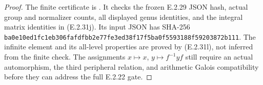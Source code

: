 \begin{proof}
The finite certificate is
.
It checks the frozen E.2.29 JSON hash, actual group and
normalizer counts, all displayed genus identities, and
the integral matrix identities in (E.2.31j). Its input
JSON has SHA-256
\texttt{ba0e10ed1fc1eb306fafdfbb2e77fe3ed38f17f5ba0f5593188f59203872b111}.
The infinite element and its all-level properties are
proved by (E.2.31l), not inferred from the finite check.
The assignments \(x\mapsto x\), \(y\mapsto f^{-1}yf\)
still require an actual automorphism, the third peripheral
relation, and arithmetic Galois compatibility before they
can address the full E.2.22 gate.
\end{proof}
